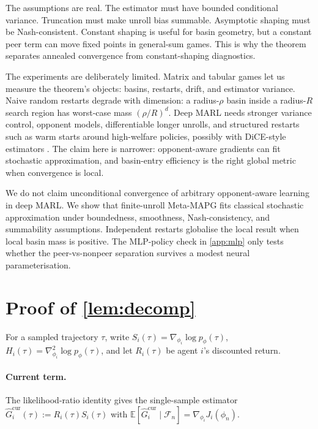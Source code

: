 \documentclass{article}
\theoremstyle{plain}
\theoremstyle{definition}
\theoremstyle{remark}
\newcommand{\E}{\mathbb{E}}
\newcommand{\F}{\mathcal{F}}
\begin{document}
The assumptions are real. The estimator must have bounded conditional variance. Truncation must make unroll bias summable. Asymptotic shaping must be Nash-consistent. Constant shaping is useful for basin geometry, but a constant peer term can move fixed points in general-sum games. This is why the theorem separates annealed convergence from constant-shaping diagnostics.

The experiments are deliberately limited. Matrix and tabular games let us measure the theorem's objects: basins, restarts, drift, and estimator variance. Naive random restarts degrade with dimension: a radius-$\rho$ basin inside a radius-$R$ search region has worst-case mass $(\rho/R)^d$. Deep MARL needs stronger variance control, opponent models, differentiable longer unrolls, and structured restarts such as warm starts around high-welfare policies, possibly with DiCE-style estimators \citep{foerster2018dice}. The claim here is narrower: opponent-aware gradients can fit stochastic approximation, and basin-entry efficiency is the right global metric when convergence is local.

We do not claim unconditional convergence of arbitrary opponent-aware learning in deep MARL. We show that finite-unroll Meta-MAPG fits classical stochastic approximation under boundedness, smoothness, Nash-consistency, and summability assumptions. Independent restarts globalise the local result when local basin mass is positive. The MLP-policy check in \cref{app:mlp} only tests whether the peer-vs-nonpeer separation survives a modest neural parameterisation.

\appendix

\section{Proof of \texorpdfstring{\cref{lem:decomp}}{Lemma 4.1}}\label{app:decomp}

For a sampled trajectory $\tau$, write $S_i(\tau)=\nabla_{\phi_i}\log p_\phi(\tau)$, $H_i(\tau)=\nabla_{\phi_i}^2\log p_\phi(\tau)$, and let $R_i(\tau)$ be agent $i$'s discounted return.

\paragraph{Current term.}
The likelihood-ratio identity \citep{williams1992simple,sutton2018reinforcement} gives the single-sample estimator
$\widehat G_i^{\mathrm{cur}}(\tau):=R_i(\tau)S_i(\tau)$ with $\E[\widehat G_i^{\mathrm{cur}}\mid\F_n]=\nabla_{\phi_i}J_i(\phi_n)$.
\end{document}
